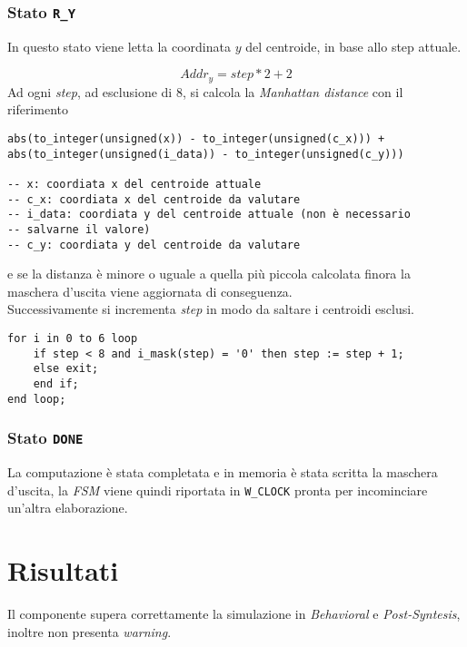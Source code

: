 \documentclass[a4paper]{report}
\begin{document}
\subsection{Stato \texttt{R\_Y}}\label{r_y}
In questo stato viene letta la coordinata $y$ del centroide, in base allo step attuale.

\[Addr_{y} = step * 2 + 2\]
Ad ogni {\it step}, ad esclusione di 8, si calcola la {\it Manhattan distance} con il riferimento
\begin{verbatim}
abs(to_integer(unsigned(x)) - to_integer(unsigned(c_x))) +
abs(to_integer(unsigned(i_data)) - to_integer(unsigned(c_y)))

-- x: coordiata x del centroide attuale
-- c_x: coordiata x del centroide da valutare
-- i_data: coordiata y del centroide attuale (non è necessario
-- salvarne il valore)
-- c_y: coordiata y del centroide da valutare
\end{verbatim}
e se la distanza è minore o uguale a quella più piccola calcolata finora la maschera d'uscita viene aggiornata di conseguenza.\bigskip\\
Successivamente si incrementa {\it step} in modo da saltare i centroidi esclusi.
\begin{verbatim}
for i in 0 to 6 loop
    if step < 8 and i_mask(step) = '0' then step := step + 1;
    else exit;
    end if;
end loop;
\end{verbatim}

\subsection{Stato \texttt{DONE}}
La computazione è stata completata e in memoria è stata scritta la maschera d'uscita, la {\it FSM} viene quindi riportata in \texttt{W\_CLOCK} pronta per incominciare un'altra elaborazione.

\chapter{Risultati}
Il componente supera correttamente la simulazione in {\it Behavioral} e {\it Post-Syntesis}, inoltre non presenta {\it warning}.
\end{document}
